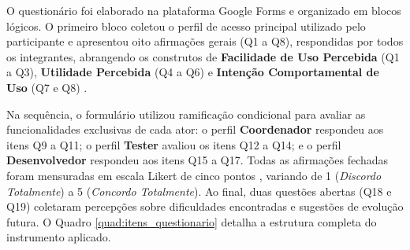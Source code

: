 O questionário foi elaborado na plataforma Google Forms e organizado em blocos lógicos. O primeiro bloco coletou o perfil de acesso principal utilizado pelo participante e apresentou oito afirmações gerais (Q1 a Q8), respondidas por todos os integrantes, abrangendo os construtos de \textbf{Facilidade de Uso Percebida} (Q1 a Q3), \textbf{Utilidade Percebida} (Q4 a Q6) e \textbf{Intenção Comportamental de Uso} (Q7 e Q8) \cite{davis1989}.

Na sequência, o formulário utilizou ramificação condicional para avaliar as funcionalidades exclusivas de cada ator: o perfil \textbf{Coordenador} respondeu aos itens Q9 a Q11; o perfil \textbf{Tester} avaliou os itens Q12 a Q14; e o perfil \textbf{Desenvolvedor} respondeu aos itens Q15 a Q17. Todas as afirmações fechadas foram mensuradas em escala Likert de cinco pontos \cite{likert1932}, variando de 1 (\textit{Discordo Totalmente}) a 5 (\textit{Concordo Totalmente}). Ao final, duas questões abertas (Q18 e Q19) coletaram percepções sobre dificuldades encontradas e sugestões de evolução futura. O Quadro \ref{quad:itens_questionario} detalha a estrutura completa do instrumento aplicado.

